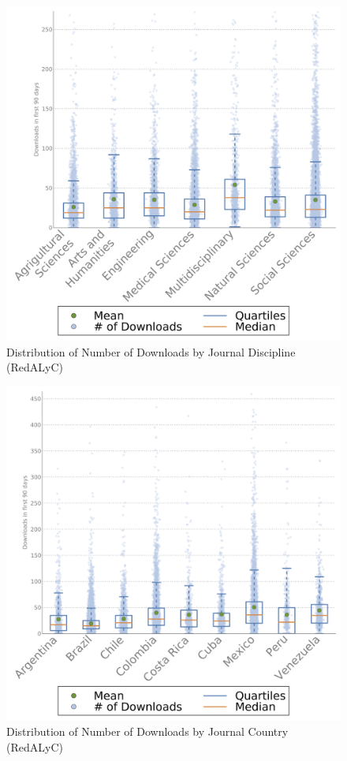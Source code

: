 \begin{figure}[htbp]
\centering
\includegraphics[keepaspectratio,width=\textwidth,height=0.45\textheight]{figures/downloads90_by_subject_redalyc.png}
\caption{Distribution of Number of Downloads by Journal Discipline (RedALyC)}
\label{downloads90_by_subject_redalyc}
\end{figure}

\begin{figure}[htbp]
\centering
\includegraphics[keepaspectratio,width=\textwidth,height=0.45\textheight]{figures/downloads90_by_country_redalyc.png}
\caption{Distribution of Number of Downloads by Journal Country (RedALyC)}
\label{downloads90_by_country_redalyc}
\end{figure}

